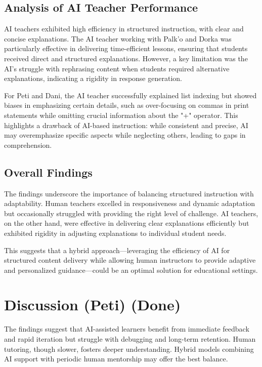 \documentclass[12pt]{article}  %
\begin{document}
\subsection{Analysis of AI Teacher Performance}
AI teachers exhibited high efficiency in structured instruction, with clear and concise explanations. The AI teacher working with Palk'o and Dorka was particularly effective in delivering time-efficient lessons, ensuring that students received direct and structured explanations. However, a key limitation was the AI’s struggle with rephrasing content when students required alternative explanations, indicating a rigidity in response generation.

For Peti and Dani, the AI teacher successfully explained list indexing but showed biases in emphasizing certain details, such as over-focusing on commas in print statements while omitting crucial information about the "+" operator. This highlights a drawback of AI-based instruction: while consistent and precise, AI may overemphasize specific aspects while neglecting others, leading to gaps in comprehension.

\subsection{Overall Findings}
The findings underscore the importance of balancing structured instruction with adaptability. Human teachers excelled in responsiveness and dynamic adaptation but occasionally struggled with providing the right level of challenge. AI teachers, on the other hand, were effective in delivering clear explanations efficiently but exhibited rigidity in adjusting explanations to individual student needs.

This suggests that a hybrid approach—leveraging the efficiency of AI for structured content delivery while allowing human instructors to provide adaptive and personalized guidance—could be an optimal solution for educational settings.

\section{Discussion (Peti) (Done)}

The findings suggest that AI-assisted learners benefit from immediate feedback and rapid iteration but struggle with debugging and long-term retention. Human tutoring, though slower, fosters deeper understanding. Hybrid models combining AI support with periodic human mentorship may offer the best balance.
\end{document}
